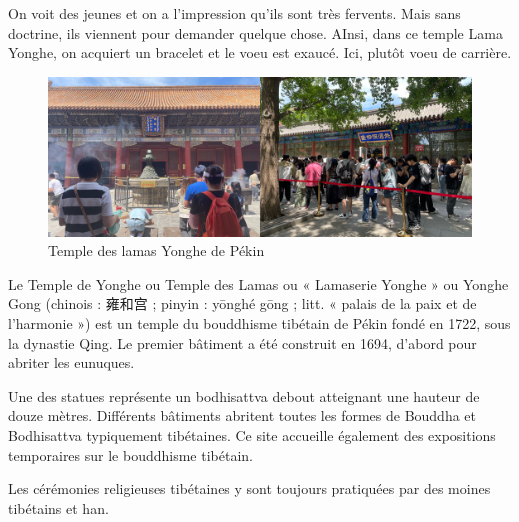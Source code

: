 \begin{Ex}

On voit des jeunes et on a l'impression qu'ils sont très fervents. Mais sans doctrine, ils viennent pour demander quelque chose. AInsi, dans ce temple Lama Yonghe, on acquiert un bracelet et le voeu est exaucé. Ici, plutôt voeu de  carrière. 
        \begin{figure}[!h]
        \centering
                \caption{Temple des lamas Yonghe de Pékin}
                \includegraphics[width=1\textwidth]{ConfucianismeTaoismeBouddhismeChinois/Images/TempleLamaYonghe.png}
            

        \label{fig:enter-label}
    \end{figure}
    Le Temple de Yonghe ou Temple des Lamas ou « Lamaserie Yonghe » ou Yonghe Gong (chinois : 雍和宫 ; pinyin : yōnghé gōng ; litt. « palais de la paix et de l'harmonie ») est un temple du bouddhisme tibétain de Pékin fondé en 1722, sous la dynastie Qing. Le premier bâtiment a été construit en 1694, d'abord pour abriter les eunuques.

Une des statues représente un bodhisattva debout atteignant une hauteur de douze mètres. Différents bâtiments abritent toutes les formes de Bouddha et Bodhisattva typiquement tibétaines. Ce site accueille également des expositions temporaires sur le bouddhisme tibétain.

Les cérémonies religieuses tibétaines y sont toujours pratiquées par des moines tibétains et han.
\end{Ex}

